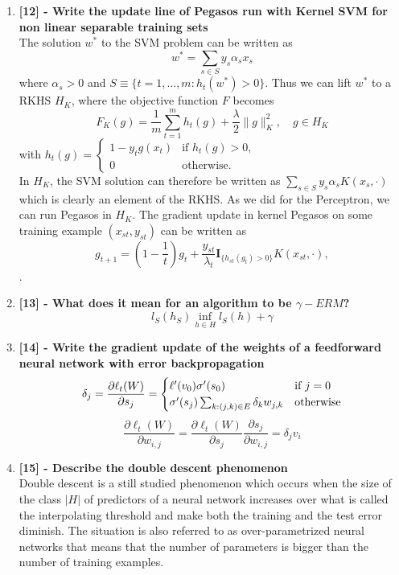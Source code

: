 \documentclass[a4paper]{report}
\begin{document}
\begin{enumerate}
    \item \textbf{[12] - Write the update line of Pegasos run with Kernel SVM for non linear separable training sets}\\
The solution $w^*$ to the SVM problem can be written as
\[
w^* = \sum_{s \in S} y_s \alpha_s x_s
\]
where $\alpha_s > 0$ and $S \equiv \{t = 1, \ldots, m : h_t(w^*) > 0\}$. Thus we can lift $w^*$ to a RKHS $H_K$, where the objective function $F$ becomes
\[
F_K(g) = \frac{1}{m} \sum_{t=1}^{m} h_t(g) + \frac{\lambda}{2} \|g\|_K^2, \quad g \in H_K
\]
with $h_t(g) = \begin{cases}
1 - y_t g(x_t) & \text{if } h_t(g) > 0, \\
0 & \text{otherwise}.
\end{cases}$ \\
In $H_K$, the SVM solution can therefore be written as
$\sum_{s \in S} y_s \alpha_s K(x_s, \cdot)$ which is clearly an element of the RKHS.
As we did for the Perceptron, we can run Pegasos in $H_K$. The gradient update in kernel Pegasos on some training example $(x_{st}, y_{st})$ can be written as
\[
g_{t+1} = \left(1 - \frac{1}{t}\right) g_t + \frac{y_{st}}{\lambda_t} \mathbf{I}_{\{h_{st}(g_t) > 0\}} K(x_{st}, \cdot),
\].
    \item \textbf{[13] - What does it mean for an algorithm to be $\gamma-ERM$?}\\
    \[l_S (h_S) \inf_{h \in H}l_S (h) + \gamma\]
    \item \textbf{[14] - Write the gradient update of the weights of a feedforward neural network with error backpropagation}\\
    \[\delta_j = \frac{\partial\ell_t(W)}{\partial s_j} \\
    = \begin{cases}
    \ell'(v_0) \sigma'(s_0) & \text{if } j = 0 \\
    \sigma'(s_j) \sum_{k : (j,k) \in E} \delta_k w_{j,k} &  \text{otherwise}
    \end{cases} \]
    \[\frac{\partial\ell_t(W)}{\partial w_{i,j}} =  \frac{\partial\ell_t(W)}{\partial s_j} \frac{\partial    s_j}{\partial w_{i,j}} = \delta_j v_i\] 
    \item \textbf{[15] - Describe the double descent phenomenon}\\
    Double descent is a still studied phenomenon which occurs when the size of the class $|H|$ of predictors of a neural network increases over what is called the interpolating threshold and make both the training and the test error diminish. The situation is also referred to as over-parametrized neural networks that means that the number of parameters is bigger than the number of training examples.

\end{enumerate}
\end{document}
